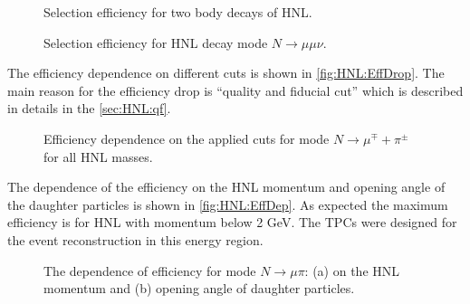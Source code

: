 \documentclass[../main.tex]{subfiles}
\begin{document}
\begin{figure}[!ht]
  \begin{minipage}{0.49\linewidth}
  \end{minipage}
  \hfill
  \begin{minipage}{0.49\linewidth}
  \end{minipage}
  \caption{Selection efficiency for two body decays of HNL.}
  \label{fig:HNL:Eff1}
\end{figure}

\begin{figure}[!ht]
  \caption{Selection efficiency for HNL decay mode $N\to\mu\mu\nu$.}
  \label{fig:HNL:Eff2}
\end{figure}
The efficiency dependence on different cuts is shown in \autoref{fig:HNL:EffDrop}. The main reason for the efficiency drop is ``quality and fiducial cut'' which is described in details in the \autoref{sec:HNL:qf}.
\begin{figure}[!ht]
  \caption{Efficiency dependence on the applied cuts for mode $N\to\mu^\mp+\pi^\pm$ for all HNL masses.}
  \label{fig:HNL:EffDrop}
\end{figure}

The dependence of the efficiency on the HNL momentum and opening angle of the daughter particles is shown in \autoref{fig:HNL:EffDep}. As expected the maximum efficiency is for HNL with momentum below 2 GeV. The TPCs were designed for the event reconstruction in this energy region.
\begin{figure}[!ht]
  \begin{minipage}{0.49\linewidth}
  \end{minipage}
  \hfill
  \begin{minipage}{0.49\linewidth}
  \end{minipage}
  \caption{The dependence of efficiency for mode $N\to\mu\pi$: (a) on the HNL momentum and (b) opening angle of daughter particles.}
  \label{fig:HNL:EffDep}
\end{figure}
\end{document}
